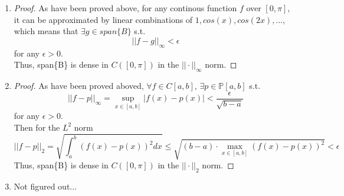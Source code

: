 \documentclass[paper=a4, fontsize=11pt]{scrartcl} %
\numberwithin{equation}{section} %
\numberwithin{figure}{section} %
\numberwithin{table}{section} %
\begin{document}
\begin{enumerate}
\begin{proof}
				\begin{equation}
					||f-p||_\infty < \epsilon
				\end{equation}
				for any $\epsilon > 0$.\\
				Assume $p$ can be writte as
				\begin{equation}
					p(x) = \sum_{i=0}^{N} a_i x^i
				\end{equation}
				Then with the change of variables $y = cos(x)$
				\begin{equation}
					f(x) = \tilde{f}(y) \approxeq p(y) = \sum_{i=0}^{N} a_i y^i = \sum_{i=0}^{N} a_i cos^i(x)
				\end{equation}
				As $cos^i(x)$ can be expressed as the sum of $1, cos(x), cos(2x), ... , cos(ix)$ with proper coefficients, $f(x)$ is therefore can be approximated uniformly by finite linear combinations of $1, cos(x), cos(2x), ... $.
			\end{proof}
		\item 
			\begin{proof}
				As have been proved above, for any continous function $f$ over $[0,\pi]$, it can be approximated by linear combinations of $1, cos(x), cos(2x), ... $, which means that $\exists g \in span\{B\}$ s.t. 
				\begin{equation}
					||f-g||_\infty < \epsilon
				\end{equation}
				for any $\epsilon > 0$.\\
				Thus, span\{B\} is dense in $C([0, \pi])$ in the $||\cdot||_\infty$ norm.
			\end{proof}
		\item 
			\begin{proof}
				As have been proved aboved, $\forall f \in C[a, b]$, $\exists p \in \mathbb{P}[a, b]$ s.t.
				\begin{equation}
					||f-p||_\infty = \sup_{x\in[a, b]}|f(x)-p(x)| < \frac{\epsilon}{\sqrt{b-a}}
				\end{equation}
				for any $\epsilon > 0$.\\
				Then for the $L^2$ norm
				\begin{equation}
					||f-p||_2 = \sqrt{\int_{a}^{b} (f(x) - p(x))^2 dx} \leq \sqrt{(b-a) \cdot \max_{x\in[a, b]}(f(x)-p(x))^2} < \epsilon
				\end{equation}
				Thus, span\{B\} is dense in $C([0, \pi])$ in the $||\cdot||_2$ norm.
			\end{proof}
		\item 
			Not figured out...
	\end{enumerate}
\end{document}
